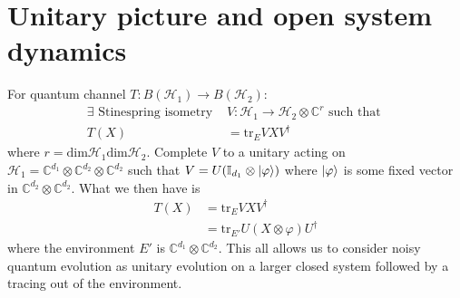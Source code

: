 \documentclass[10pt,oneside,longbibliography]{report}
\begin{document}
\section{Unitary picture and open system dynamics}
For quantum channel $T: B(\mathcal{H}_1) \rightarrow B(\mathcal{H}_2)$: 
\begin{align}
    \exists \text{ Stinespring isometry } &V: \mathcal{H}_1 \rightarrow \mathcal{H}_2 \otimes \mathbb{C}^r \text{ such that } \\
    T(X)&= \text{tr}_E VXV^{\dagger}
\end{align}
where $r=\text{dim}\mathcal{H}_1\text{dim}\mathcal{H}_2$. Complete $V$ to a unitary acting on $ \mathcal{H}_1 = \mathbb{C}^{d_1} \otimes \mathbb{C}^{d_2} \otimes \mathbb{C}^{d_2}$ such that $V=U(\mathbb{I}_{d_1} \otimes \ket{\varphi})$ where $\ket{\varphi}$ is some fixed vector in $\mathbb{C}^{d_2}\otimes \mathbb{C}^{d_2}$. What we then have is 
\begin{align}
    T(X) &= \text{tr}_E VXV^{\dagger} \\
    &= \text{tr}_{E'} U(X \otimes \varphi) U^{\dagger} 
\end{align}
where the environment $E'$ is $\mathbb{C}^{d_1}\otimes \mathbb{C}^{d_2}$. This all allows us to consider noisy quantum evolution as unitary evolution on a larger closed system followed by a tracing out of the environment.

{}

\end{document}
